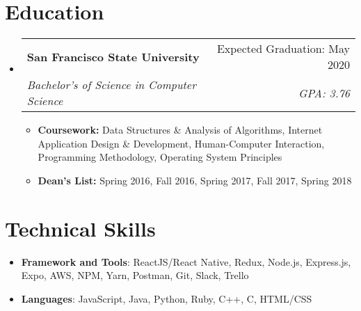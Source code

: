 \documentclass[letterpaper, 10pt]{article}
\makeatletter
\newcommand{\resumeItem}[2]{
  \item\small{
    \textbf{#1}{#2 \vspace{-2pt}}
  }
}
\newcommand{\resumeSubheading}[4]{
  \vspace{-1pt}\item
    \begin{tabular*}{0.97\textwidth}{l@{\extracolsep{\fill}}r}
      \textbf{#1} & #2 \\
      \textit{\small#3} & \textit{\small #4} \\
    \end{tabular*}\vspace{-5pt}
}
\newcommand{\resumeSubHeadingListStart}{\begin{itemize}[leftmargin=*]}
\newcommand{\resumeSubHeadingListEnd}{\end{itemize}}
\newcommand{\resumeItemListStart}{\begin{itemize}}
\newcommand{\resumeItemListEnd}{\end{itemize}\vspace{-5pt}}
\makeatother
\begin{document}
\section{Education}
  \resumeSubHeadingListStart
    \resumeSubheading
      {San Francisco State University}{Expected Graduation: May 2020}
      {Bachelor's of Science in Computer Science}{GPA: 3.76}
      \resumeItemListStart
        \resumeItem{Coursework: }
          {Data Structures \& Analysis of Algorithms, Internet Application Design \& Development, Human-Computer Interaction, Programming Methodology, Operating System Principles}
          \resumeItem{Dean's List: }
          {Spring 2016, Fall 2016, Spring 2017, Fall 2017, Spring 2018}
      \resumeItemListEnd
\resumeSubHeadingListEnd

\section{Technical Skills}
 \resumeSubHeadingListStart
   \item{
     \textbf{Framework and Tools}{: ReactJS/React Native, Redux, Node.js, Express.js, Expo, AWS, NPM, Yarn, Postman, Git, Slack, Trello }
    }
 \resumeSubHeadingListEnd
 
 \resumeSubHeadingListStart
    \item{
     \textbf{Languages}{: JavaScript, Java, Python, Ruby, C++, C, HTML/CSS}
    }
 \resumeSubHeadingListEnd
 
\end{document}
